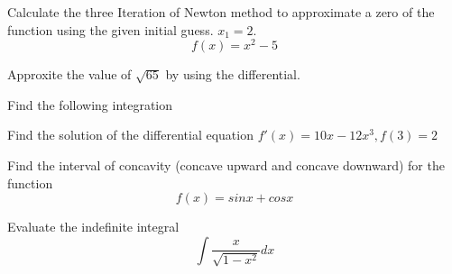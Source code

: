 \documentclass[11pt]{exam}
\begin{document}
\begin{questions}
\vspace{8cm}
\newpage
\addpoints
\question[5] Calculate the three Iteration of Newton method to approximate a zero of the function using the given initial guess. $x_1=2$. \[f(x)=x^2-5\]


\vspace{9cm}
\addpoints
\question[8] Approxite the value of $\sqrt{65}$ by using the differential. 

\newpage
\addpoints
\question[10] Find the following integration


\vspace{8cm}
\addpoints
\question[7] Find the solution of the differential equation $f'(x)=10x-12x^3, f(3)=2$


\vspace{8cm}
\addpoints
\question[10] Find the interval of concavity (concave upward and concave downward) for the function 
\[f(x)=sinx+cosx\]


\vspace{8cm}
\noaddpoints
\question[5 Bonus] Evaluate the indefinite integral \[\int \frac{x}{\sqrt{1-x^2}}dx\]
\end{questions}
\end{document}
